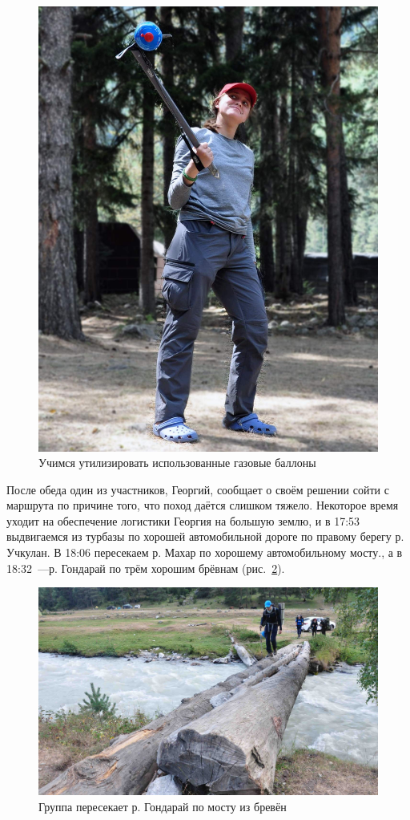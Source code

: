\begin{figure}[h!]
\begin{minipage}[h]{0.30\linewidth}
		\includegraphics[width=\linewidth]{../pics/DSC_1152.jpg}
	\end{minipage}
	\caption{Учимся утилизировать использованные газовые баллоны \smiley}
	\label{fig:DSC_1150}
\end{figure}

После обеда один из участников, Георгий, сообщает о своём решении сойти с маршрута по причине того, что поход даётся слишком тяжело. Некоторое время уходит на обеспечение логистики Георгия на большую землю, и в 17:53 выдвигаемся из турбазы по хорошей автомобильной дороге по правому берегу р. Учкулан. В 18:06 пересекаем р. Махар по хорошему автомобильному мосту., а в 18:32~---р. Гондарай по трём хорошим брёвнам (рис.~\ref{fig:hondaray}).

\begin{figure}[h]
	\centering
	\includegraphics[width=0.7\linewidth]{../pics/DSC_1167}
	\caption{Группа пересекает р. Гондарай по мосту из бревён}
	\label{fig:hondaray}
\end{figure}

